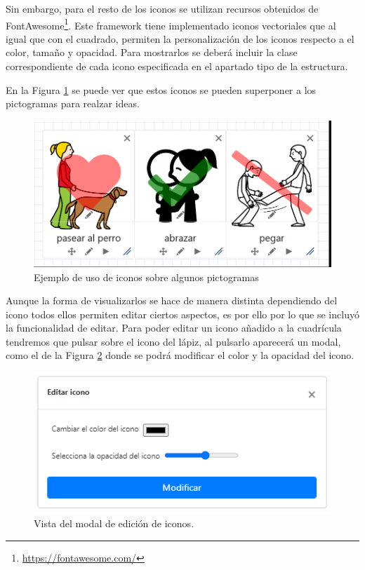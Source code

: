 Sin embargo, para el resto de los iconos se utilizan recursos obtenidos de FontAwesome\footnote{\url{https://fontawesome.com/}}. Este framework tiene implementado iconos vectoriales que al igual que con el cuadrado, permiten la personalización de los iconos respecto a el color, tamaño y opacidad. Para mostrarlos se deberá incluir la clase correspondiente de cada icono especificada en el apartado tipo de la estructura.

En la Figura \ref{fig:ejemplopictoitem} se puede ver que estos iconos se pueden superponer a los pictogramas para realzar ideas.

\begin{figure}[h!]
	\centering
	\includegraphics[width=0.7\linewidth]{Imagenes/Bitmap/ejemploPictoItem}
	\caption{Ejemplo de uso de iconos sobre algunos pictogramas}
	\label{fig:ejemplopictoitem}
\end{figure}

 
Aunque la forma de visualizarlos se hace de manera distinta dependiendo del icono todos ellos permiten editar ciertos aspectos, es por ello por lo que se incluyó la funcionalidad de editar. Para poder editar un icono añadido a la cuadrícula tendremos que pulsar sobre el icono del lápiz, al pulsarlo aparecerá un modal, como el de la Figura \ref{fig:modalpictoitem} donde se podrá modificar el color y la opacidad del icono.  

\begin{figure}[h!]
	\centering
	\includegraphics[width=0.7\linewidth]{Imagenes/Bitmap/modalPictoItem}
	\caption{Vista del modal de edición de iconos.}
	\label{fig:modalpictoitem}
\end{figure}


